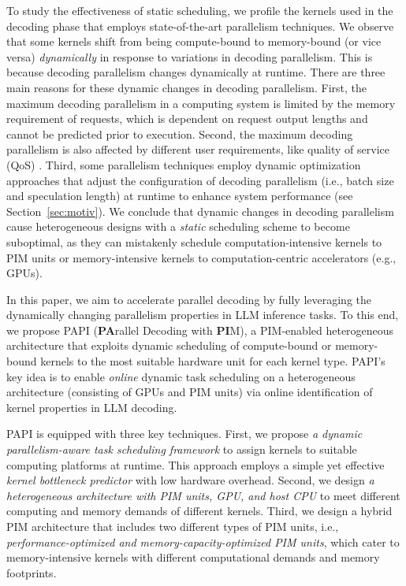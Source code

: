To study the effectiveness of static scheduling, we profile the kernels used in the decoding phase that employs state-of-the-art parallelism techniques. We observe that some kernels shift from being compute-bound to memory-bound (or vice versa) \emph{dynamically} in response to variations in decoding parallelism. This is because decoding parallelism changes dynamically at runtime. 
There are three main reasons for these dynamic changes in decoding parallelism. 
First, the maximum decoding parallelism in a computing system is limited by the memory requirement of requests, which is dependent on request output lengths and cannot be predicted prior to execution. 
Second, the maximum decoding parallelism is also affected by different user requirements, like quality of service (QoS) \cite{agrawal2024taming}. 
Third, some parallelism techniques \cite{patel2024splitwise, mamou2024accelerating} employ dynamic optimization approaches that adjust the configuration of decoding parallelism (i.e., batch size and speculation length) at runtime to enhance system performance (see Section~\ref{sec:motiv}). 
We conclude that dynamic changes in decoding parallelism cause heterogeneous designs with a \emph{static} scheduling scheme to become suboptimal, as they can mistakenly schedule computation-intensive kernels to PIM units or memory-intensive kernels to computation-centric accelerators (e.g., GPUs).



In this paper, we aim to accelerate parallel decoding by fully leveraging the dynamically changing parallelism properties in LLM inference tasks. To this end, we propose PAPI (\textbf{PA}rallel Decoding with \textbf{PI}M), a PIM-enabled heterogeneous architecture that exploits dynamic scheduling of compute-bound or memory-bound kernels to the most suitable hardware unit for each kernel type.
PAPI's key idea is to enable \emph{online} dynamic task scheduling on a heterogeneous architecture (consisting of GPUs and PIM units) via online identification of kernel properties in LLM decoding. 

PAPI is equipped with three key techniques.
First, we propose \emph{a dynamic parallelism-aware task scheduling framework} to assign kernels to suitable computing platforms at runtime. This approach employs a simple yet effective \emph{kernel bottleneck predictor} with low hardware overhead. 
Second, we design \emph{a heterogeneous architecture with PIM units, GPU, and host CPU} to meet different computing and memory demands of different kernels. 
Third, we design a hybrid PIM architecture that includes two different types of PIM units, i.e., \emph{performance-optimized and memory-capacity-optimized PIM units}, which cater to memory-intensive kernels with different computational demands and memory footprints.


